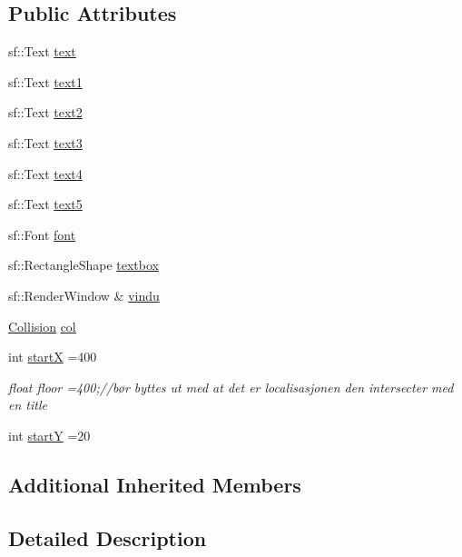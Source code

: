 \subsection*{Public Attributes}
\begin{DoxyCompactItemize}
\item 
sf\+::\+Text \hyperlink{class_textbox_a4f79784c45871da706e57c8435c8dff3}{text}
\item 
sf\+::\+Text \hyperlink{class_textbox_a5c229bd6795f3ab970ee0bf10252613d}{text1}
\item 
sf\+::\+Text \hyperlink{class_textbox_adafebfa39688753f259c72a7fcdcc3ad}{text2}
\item 
sf\+::\+Text \hyperlink{class_textbox_abccc498be23e0a6d7271a4692ae50289}{text3}
\item 
sf\+::\+Text \hyperlink{class_textbox_a37cfcc698bdbb5014fdc6ecf56c083c8}{text4}
\item 
sf\+::\+Text \hyperlink{class_textbox_a4f9b578979f37d545571532e41148a45}{text5}
\item 
sf\+::\+Font \hyperlink{class_textbox_a45eac53d4f51e36a8c0acfdc9df2f0cb}{font}
\item 
sf\+::\+Rectangle\+Shape \hyperlink{class_textbox_a6da196e36384e83b7dc9fa9f81848536}{textbox}
\item 
sf\+::\+Render\+Window \& \hyperlink{class_textbox_a43cc0d802e43397e373997b8595073ad}{vindu}
\item 
\hyperlink{class_collision}{Collision} \hyperlink{class_textbox_ad89bdee3ead7d89dca3e1ba1468c272c}{col}
\item 
int \hyperlink{class_textbox_a8b9942b46c9fab7ed505918750174006}{startX} =400
\begin{DoxyCompactList}\small\item\em float floor =400;//bør byttes ut med at det er localisasjonen den intersecter med en title \end{DoxyCompactList}\item 
int \hyperlink{class_textbox_a7cc50c3fa4ef2866a7d2acc7f2d5565b}{startY} =20
\end{DoxyCompactItemize}
\subsection*{Additional Inherited Members}


\subsection{Detailed Description}


